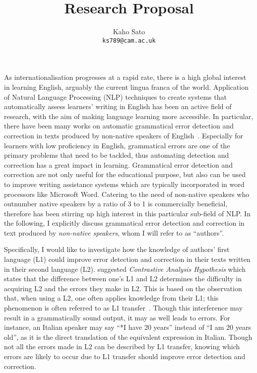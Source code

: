 \documentclass[11pt]{article}
\title{Research Proposal}
\author{
 Kaho Sato\\
  \texttt{ks789@cam.ac.uk}
}
\begin{document}
\maketitle
As internationalisation progresses at a rapid rate, there is a high global interest in learning English, arguably the current lingua franca of the world. Application of Natural Language Processing (NLP) techniques to create systems that automatically assess learners' writing in English has been an active field of research, with the aim of making language learning more accessible. In particular, there have been many works on automatic grammatical error detection and correction in texts produced by non-native speakers of English~\citep{izumi2003automatic, eeg2003automatic, han2006detecting, tetreault2008ups, de2008classifier, gamon2008using, gamon2010using, ng2014conll}. Especially for learners with low proficiency in English, grammatical errors are one of the primary problems that need to be tackled, thus automating detection and correction has a great impact in learning. Grammatical error detection and correction are not only useful for the educational purpose, but also can be used to improve writing assistance systems which are typically incorporated in word processors like Microsoft Word. Catering to the need of non-native speakers who outnumber native speakers by a ratio of 3 to 1 is commercially beneficial, therefore has been stirring up high interest in this particular sub-field of NLP. In the following, I explicitly discuss grammatical error detection and correction in text produced by \emph{non-native speakers}, whom I will refer to as ``authors''.

Specifically, I would like to investigate how the knowledge of authors' first language (L1) could improve error detection and correction in their texts written in their second language (L2). \cite{lado1957linguistics} suggested \emph{Contrastive Analysis Hypothesis} which states that the difference between one's L1 and L2 determines the difficulty in acquiring L2 and the errors they make in L2. This is based on the observation that, when using a L2, one often applies knowledge from their L1; this phenomenon is often referred to as L1 transfer~\citep{wanner1982language, frenck1997syntactic, dussias2003syntactic, nitschke2010first}. Though this interference may result in a grammatically sound output, it may as well leads to errors. For instance, an Italian speaker may say ``*I have 20 years'' instead of ``I am 20 years old'', as it is the direct translation of the equivalent expression in Italian. Though not all the errors made in L2 can be described by L1 transfer, knowing which errors are likely to occur due to L1 transfer should improve error detection and correction.
\end{document}
